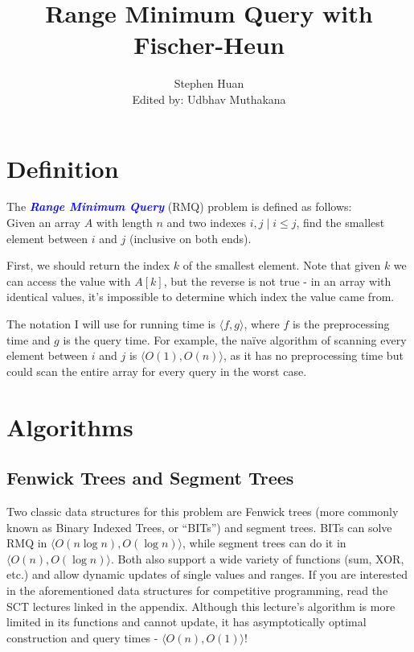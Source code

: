 \documentclass[11pt, oneside]{article}
\title{Range Minimum Query with Fischer-Heun}
\author{Stephen Huan\\ Edited by: Udbhav Muthakana}
\newcommand{\emphasis}[1]{\textcolor{blue}{\textbf{\textit{#1}}}}
\begin{document}
\maketitle

\section{Definition}

The \emphasis{Range Minimum Query} (RMQ) problem is defined as follows: \\
Given an array \( A \) with length \( n \) and two indexes \( i, j \mid i \leq j \),
find the smallest element between \( i \) and \( j \) (inclusive on both ends).

First, we should return the index \( k \) of the smallest element.
Note that given \( k \) we can access the value
with \( A[k] \), but the reverse is not true - in an array with identical values,
it's impossible to determine which index the value came from.

The notation I will use for running time is \( \langle f, g \rangle \),
where \( f \) is the preprocessing time and \( g \) is the query time. For example,
the naïve algorithm of scanning every element between \( i \) and \( j \)
is \( \langle O(1), O(n) \rangle \), as it has no preprocessing time
but could scan the entire array for every query in the worst case.

\section{Algorithms}
\subsection{Fenwick Trees and Segment Trees}

Two classic data structures for this problem are Fenwick trees (more commonly known as Binary Indexed Trees, or ``BITs'')
and segment trees. BITs can solve RMQ in \( \langle O(n \log n), O(\log n) \rangle \), while segment trees
can do it in \( \langle O(n), O(\log n) \rangle \). Both also support a wide variety of functions (sum, XOR, etc.) and
allow dynamic updates of single values and ranges. If you are interested in the aforementioned data structures for competitive programming,
read the SCT lectures linked in the appendix. Although this lecture's algorithm is more limited in its functions
and cannot update, it has asymptotically optimal construction and query times - \( \langle O(n), O(1) \rangle \)!
\end{document}
